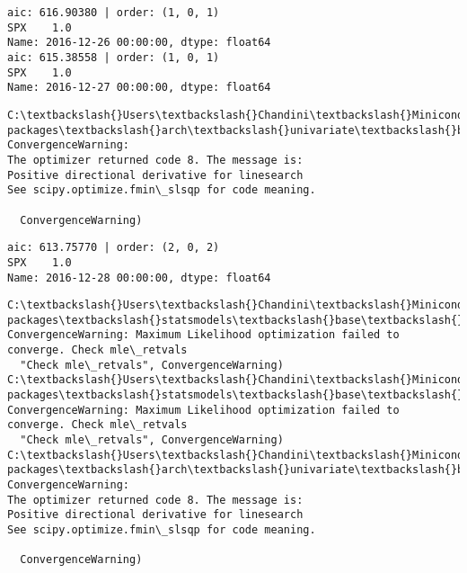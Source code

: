 \documentclass[11pt]{article}
\begin{document}
    \begin{Verbatim}[commandchars=\\\{\}]
aic: 616.90380 | order: (1, 0, 1)
SPX    1.0
Name: 2016-12-26 00:00:00, dtype: float64
aic: 615.38558 | order: (1, 0, 1)
SPX    1.0
Name: 2016-12-27 00:00:00, dtype: float64

    \end{Verbatim}

    \begin{Verbatim}[commandchars=\\\{\}]
C:\textbackslash{}Users\textbackslash{}Chandini\textbackslash{}Miniconda3\textbackslash{}envs\textbackslash{}auquan\textbackslash{}lib\textbackslash{}site-packages\textbackslash{}arch\textbackslash{}univariate\textbackslash{}base.py:513: ConvergenceWarning: 
The optimizer returned code 8. The message is:
Positive directional derivative for linesearch
See scipy.optimize.fmin\_slsqp for code meaning.

  ConvergenceWarning)

    \end{Verbatim}

    \begin{Verbatim}[commandchars=\\\{\}]
aic: 613.75770 | order: (2, 0, 2)
SPX    1.0
Name: 2016-12-28 00:00:00, dtype: float64

    \end{Verbatim}

    \begin{Verbatim}[commandchars=\\\{\}]
C:\textbackslash{}Users\textbackslash{}Chandini\textbackslash{}Miniconda3\textbackslash{}envs\textbackslash{}auquan\textbackslash{}lib\textbackslash{}site-packages\textbackslash{}statsmodels\textbackslash{}base\textbackslash{}model.py:496: ConvergenceWarning: Maximum Likelihood optimization failed to converge. Check mle\_retvals
  "Check mle\_retvals", ConvergenceWarning)
C:\textbackslash{}Users\textbackslash{}Chandini\textbackslash{}Miniconda3\textbackslash{}envs\textbackslash{}auquan\textbackslash{}lib\textbackslash{}site-packages\textbackslash{}statsmodels\textbackslash{}base\textbackslash{}model.py:496: ConvergenceWarning: Maximum Likelihood optimization failed to converge. Check mle\_retvals
  "Check mle\_retvals", ConvergenceWarning)
C:\textbackslash{}Users\textbackslash{}Chandini\textbackslash{}Miniconda3\textbackslash{}envs\textbackslash{}auquan\textbackslash{}lib\textbackslash{}site-packages\textbackslash{}arch\textbackslash{}univariate\textbackslash{}base.py:513: ConvergenceWarning: 
The optimizer returned code 8. The message is:
Positive directional derivative for linesearch
See scipy.optimize.fmin\_slsqp for code meaning.

  ConvergenceWarning)

    \end{Verbatim}
\end{document}
